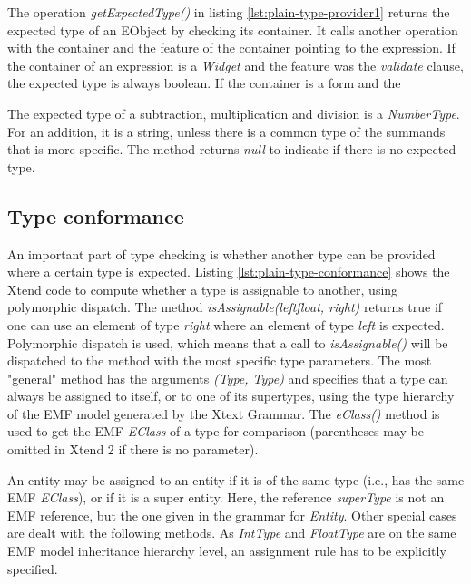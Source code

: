 

The operation \emph{getExpectedType()} in listing \ref{lst:plain-type-provider1}
returns the expected type of an EObject by checking its container. It calls another operation with the container and the feature of the container pointing to the expression. If the container of an expression is a \emph{Widget} and the feature was the \emph{validate} clause, the expected type is always boolean. If the container is a form and the 

The expected type of a subtraction, multiplication and division is a \emph{NumberType}. For an addition, it is a string, unless there
is a common type of the summands that is more specific. The method returns
\emph{null} to indicate if there is no expected type.

%

\subsection{Type conformance}
An important part of type checking is whether another type can be provided where
a certain type is expected.
Listing \ref{lst:plain-type-conformance} shows the Xtend code to compute whether
a type is assignable to another, using polymorphic dispatch. The method
\emph{isAssignable(leftfloat, right)} returns true if one can use an element of
type \emph{right} where an element of type \emph{left} is expected. Polymorphic
dispatch is used, which means that a call to \emph{isAssignable()} will be
dispatched to the method with the most specific type parameters. The most
"general" method has the arguments \emph{(Type, Type)} and specifies that a type
can always be assigned to itself, or to one of its supertypes, using the type
hierarchy of the EMF model generated by the Xtext Grammar. The \emph{eClass()}
method is used to get the EMF \emph{EClass} of a type for comparison
(parentheses may be omitted in Xtend 2 if there is no parameter).

An entity may be assigned to an entity if it is of the same type (i.e., has the
same EMF \emph{EClass}), or if it is a super entity. Here, the reference
\emph{superType} is not an EMF reference, but the one given in the grammar for
\emph{Entity}. Other special cases are dealt with the following methods. As
\emph{IntType} and \emph{FloatType} are on the same EMF model inheritance
hierarchy level, an assignment rule has to be explicitly specified.

